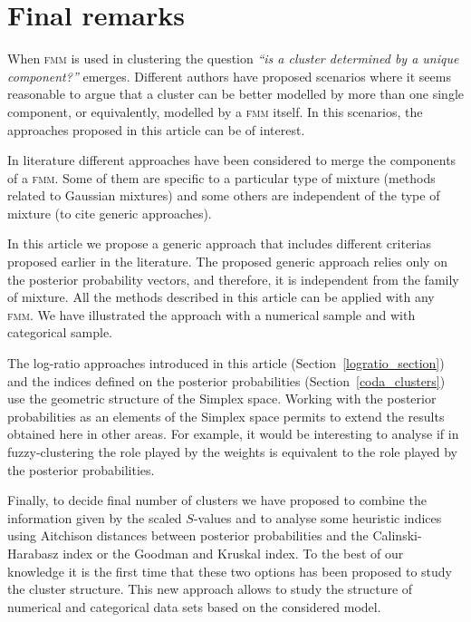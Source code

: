 \documentclass[submit]{smj}
\theoremstyle{definition}
\newcommand{\fmm}{\textsc{fmm}\xspace}
\begin{document}
\section{Final remarks}\label{remarks}

When \fmm is used in clustering the question \textit{``is a cluster determined by a unique component?''} emerges. Different authors have proposed scenarios where it seems reasonable to argue that a cluster can be better modelled by more than one single component, or equivalently, modelled by a \fmm itself. In this scenarios, the approaches proposed in this article can be of interest.

In literature different approaches have been considered to merge the components of a \fmm. Some of them are specific to a particular type of mixture (methods related to Gaussian mixtures) and some others are independent of the type of mixture (to cite generic approaches). 

In this article we propose a generic approach that includes different criterias proposed earlier in the literature. The proposed generic approach relies only on the posterior probability vectors, and therefore, it is independent from the family of mixture. All the methods described in this article can be applied with any \fmm. We have illustrated the approach with a numerical sample and with categorical sample. 

The log-ratio approaches introduced in this article (Section~\ref{logratio_section}) and the indices defined on the posterior probabilities (Section~\ref{coda_clusters}) use the geometric structure of the Simplex space. Working with the posterior probabilities as an elements of the Simplex space permits to extend the results obtained here in other areas. For example, it would be interesting to analyse if in fuzzy-clustering the role played by the weights is equivalent to the role played by the posterior probabilities. 

Finally, to decide final number of clusters we have proposed to combine the information given by the scaled $S$-values and to analyse some heuristic indices using Aitchison distances between posterior probabilities and  the Calinski-Harabasz index or  the Goodman and Kruskal index. To the best of our knowledge it is the first time that these two options has been proposed to study the cluster structure. This new approach allows to study the structure of numerical and categorical data sets based on the considered model.


\end{document}
